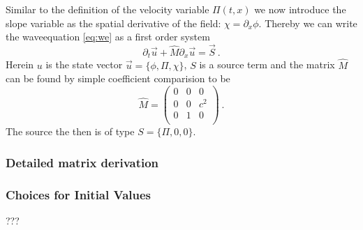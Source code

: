 Similar to the definition of the velocity variable $\Pi(t,x)$ we now introduce the slope variable as the spatial derivative of the field: $\chi = \partial_x \phi$.
Thereby we can write the waveequation \ref{eq:we} as a first order system
\begin{equation}
	\partial_t \vec{u} + \hat{M} \partial_x \vec{u} = \vec{S} ~.
	\label{eq:we-matrix}
\end{equation}
Herein $u$ is the state vector $\vec{u} = \{ \phi, \Pi , \chi \}$, $S$ is a source term and the matrix $\hat{M}$ can be found by simple coefficient comparision to be
\[
\hat{M} = \begin{pmatrix}
		0 & 0 & 0 \\
		0 & 0 & c^2 \\
		0 & 1 & 0 \\
	\end{pmatrix}~. \]
The source the then is of type $S = \{\Pi,0,0 \}$.


\subsubsection{Detailed matrix derivation}
\subsubsection{Choices for Initial Values}
???

